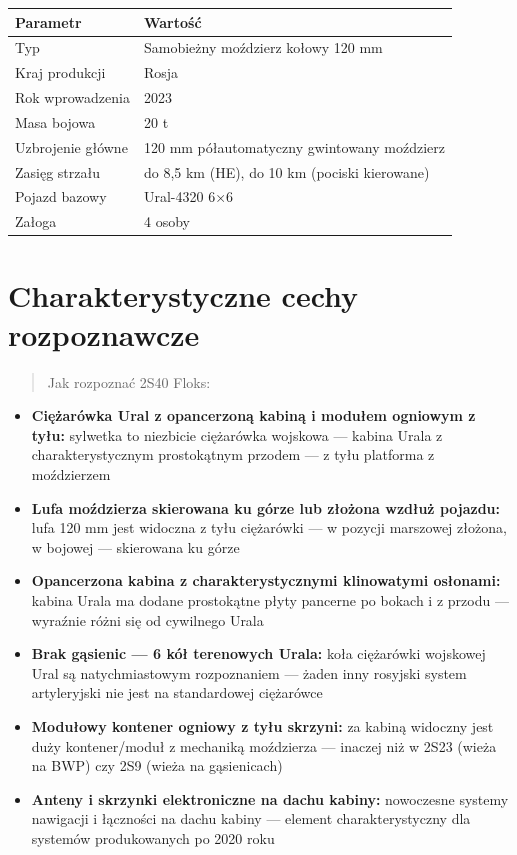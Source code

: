 \documentclass[12pt,openany,oneside]{book}
\providecommand{\tightlist}{%
  \setlength{\itemsep}{0pt}\setlength{\parskip}{0pt}}
\begin{document}
\begin{longtable}[]{@{}ll@{}}
\toprule\noalign{}
Parametr & Wartość \\
\midrule\noalign{}
\endhead
\bottomrule\noalign{}
\endlastfoot
Typ & Samobieżny moździerz kołowy 120 mm \\
Kraj produkcji & Rosja \\
Rok wprowadzenia & 2023 \\
Masa bojowa & 20 t \\
Uzbrojenie główne & 120 mm półautomatyczny gwintowany moździerz \\
Zasięg strzału & do 8,5 km (HE), do 10 km (pociski kierowane) \\
Pojazd bazowy & Ural-4320 6×6 \\
Załoga & 4 osoby \\
\end{longtable}

\section{Charakterystyczne cechy
rozpoznawcze}\label{charakterystyczne-cechy-rozpoznawcze-15}

\begin{quote}
Jak rozpoznać 2S40 Floks:
\end{quote}

\begin{itemize}
\tightlist
\item
  \textbf{Ciężarówka Ural z opancerzoną kabiną i modułem ogniowym z
  tyłu:} sylwetka to niezbicie ciężarówka wojskowa --- kabina Urala z
  charakterystycznym prostokątnym przodem --- z tyłu platforma z
  moździerzem
\item
  \textbf{Lufa moździerza skierowana ku górze lub złożona wzdłuż
  pojazdu:} lufa 120 mm jest widoczna z tyłu ciężarówki --- w pozycji
  marszowej złożona, w bojowej --- skierowana ku górze
\item
  \textbf{Opancerzona kabina z charakterystycznymi klinowatymi
  osłonami:} kabina Urala ma dodane prostokątne płyty pancerne po bokach
  i z przodu --- wyraźnie różni się od cywilnego Urala
\item
  \textbf{Brak gąsienic --- 6 kół terenowych Urala:} koła ciężarówki
  wojskowej Ural są natychmiastowym rozpoznaniem --- żaden inny rosyjski
  system artyleryjski nie jest na standardowej ciężarówce
\item
  \textbf{Modułowy kontener ogniowy z tyłu skrzyni:} za kabiną widoczny
  jest duży kontener/moduł z mechaniką moździerza --- inaczej niż w 2S23
  (wieża na BWP) czy 2S9 (wieża na gąsienicach)
\item
  \textbf{Anteny i skrzynki elektroniczne na dachu kabiny:} nowoczesne
  systemy nawigacji i łączności na dachu kabiny --- element
  charakterystyczny dla systemów produkowanych po 2020 roku
\end{itemize}
\end{document}

